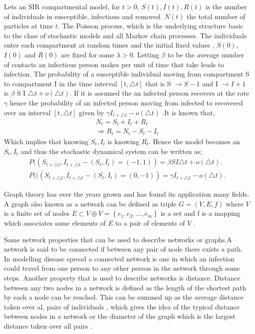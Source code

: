  Lets an SIR compartmental model, for $t > 0$, $S(t),I(t),R(t)$ is the number of individuals in susceptible, infectious and removed. $N(t)$ the total number of particles at time $t$. The Poisson process, which is the underlying structure basic to the class of stochastic models and all Markov chain processes\citep{greenwood2009stochastic}. The individuals enter each compartment at random times and the initial fixed values , $S(0)$,$I(0)$ and $R(0)$ are fixed for some $\lambda > 0$. Letting $\beta$ to be the average number of  contacts an infectious person makes per unit of time that take leads to infection. The probability of a susceptible individual moving from compartment S to compartment I in the time interval $\left[ t,\triangle t \right]$ that is  S $\rightarrow S-1$ and I $\rightarrow I + 1 $ is $ \beta$ S I $ \triangle t + o (\triangle t)$. If it is assumed the an infected person recovers at the rate $\gamma$ hence the probability of an infected person moving from infected to recovered over an interval $\left[ t,\triangle t \right]$  given by $\gamma I_{t + \triangle t} -o (\triangle t)$ .It is known that,
 \begin{align*}
 N_t = S_t + I_t + R_t
 \\ \Rightarrow  R_t = N_t - S_t - I_t
\end{align*}  
Which implies that knowing $S_t,I_t$ is knowing $R_t$. Hence the model becomes an $S_t,I_t$ and thus the stochastic dynamical system can be written as;
 \begin{align}
 P((S_{t + \triangle t}, I_{t + \triangle t} - (S_t ,I_t) = ( - 1,1)) =  \beta S I  \triangle t + o (\triangle t).
 \\ P (((S_{t + \triangle t}, I_{t + \triangle t} - (S_t ,I_t) = ( 0,-1)) = \gamma I_{t + \triangle t} -o (\triangle t).
 \end{align}
 

Graph theory has over the years grown and has found its application many fields. A graph also known as a network   can be  defined as triple $G = (V,E,f)$ where $V$ is a finite set of nodes $E \subset V \oplus V = \left\lbrace e_1,e_2,\dots ,e_m \right\rbrace$ is a set and f is a mapping which associates some elements of $E$ to a pair of elements of $V$ \citep{estrada2012structure}. 

Some network properties that can be used to describe networks or graphs.A network is said to be connected if between any pair of node there exists a path. In modelling disease spread a connected network is one in which an infection could travel from one person to any other person in the network through some steps. Another property that is used to describe networks is distance. Distance between any two nodes in a network is defined as the length of the shortest path by each a node can be reached. This can be summed up as the average distance taken over al, pairs of individuals , which gives the idea of the typical distance between nodes in a network or the diameter of the graph which is the largest distance taken over all pairs \citep{chung2002average}.

